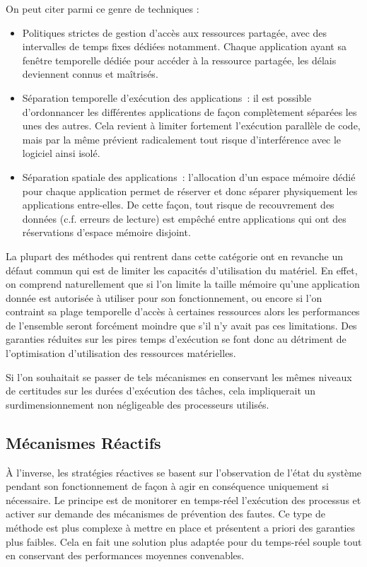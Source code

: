 \documentclass[french, a4paper, 11pt, twoside, pdftex]{StyleThese}
\begin{document}
		On peut citer parmi ce genre de techniques : 
		\begin{itemize}
		\item 			Politiques strictes de gestion d'accès aux ressources partagée, avec des intervalles de temps fixes dédiées notamment. Chaque application ayant sa fenêtre temporelle dédiée pour accéder à la ressource partagée, les délais deviennent connus et maîtrisés.
		\item 			Séparation temporelle d'exécution des applications~: il est possible d'ordonnancer les différentes applications de façon complètement séparées les unes des autres. Cela revient à limiter fortement l'exécution parallèle de code, mais par la même prévient radicalement tout risque d'interférence avec le logiciel ainsi isolé.
		\item 			Séparation spatiale des applications~: l'allocation d'un espace mémoire dédié pour chaque application permet de réserver et donc séparer physiquement les applications entre-elles. De cette façon, tout risque de recouvrement des données (c.f. erreurs de lecture) est empêché entre applications qui ont des réservations d'espace mémoire disjoint.
		\end{itemize}
		
		La plupart des méthodes qui rentrent dans cette catégorie ont en revanche un défaut commun qui est de limiter les capacités d'utilisation du matériel. En effet, on comprend naturellement que si l'on limite la taille mémoire qu'une application donnée est autorisée à utiliser pour son fonctionnement, ou encore si l'on contraint sa plage temporelle d'accès à certaines ressources alors les performances de l'ensemble seront forcément moindre que s'il n'y avait pas ces limitations. Des garanties réduites sur les pires temps d'exécution se font donc au détriment de l'optimisation d'utilisation des ressources matérielles. 
		
		Si l'on souhaitait se passer de tels mécanismes en conservant les mêmes niveaux de certitudes sur les durées d'exécution des tâches, cela impliquerait un surdimensionnement non négligeable des processeurs utilisés. 

	\subsection{Mécanismes Réactifs}
		À l'inverse, les stratégies réactives se basent sur l'observation de l'état du système pendant son fonctionnement de façon à agir en conséquence uniquement si nécessaire. Le principe est de monitorer en temps-réel l'exécution des processus et activer sur demande des mécanismes de prévention des fautes. Ce type de méthode est plus complexe à mettre en place et présentent a priori des garanties plus faibles. Cela en fait une solution plus adaptée pour du temps-réel souple tout en conservant des performances moyennes convenables. 
		
\end{document}
